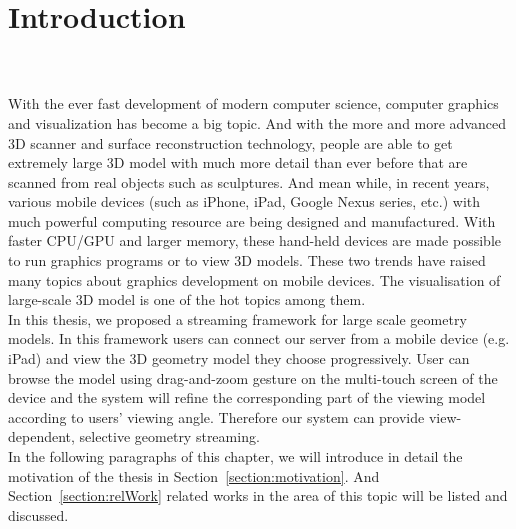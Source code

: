 \chapter{Introduction}
\label{chapter:introduction}
\\
\\

With the ever fast development of modern computer science, computer graphics and visualization has become a big topic. And with the more and more advanced 3D scanner and surface reconstruction technology, people are able to get extremely large 3D model with much more detail than ever before that are scanned from real objects such as sculptures. 
And mean while, in recent years, various mobile devices (such as iPhone, iPad, Google Nexus series, etc.) with much powerful computing resource are being designed and manufactured. With faster CPU/GPU and larger memory, these hand-held devices are made possible to run graphics programs or to view 3D models. These two trends have raised many topics about graphics development on mobile devices. The visualisation of large-scale 3D model is one of the hot topics among them. \\

In this thesis, we proposed a streaming framework for large scale geometry models. In this framework users can connect our server from a mobile device (e.g. iPad) and view the 3D geometry model they choose progressively. User can browse the model using drag-and-zoom gesture on the multi-touch screen of the device and the system will refine the corresponding part of the viewing model according to users' viewing angle. Therefore our system can provide view-dependent, selective geometry streaming. \\

In the following paragraphs of this chapter, we will introduce in detail the motivation of the thesis in Section~\ref{section:motivation}. And Section~\ref{section:relWork} related works in the area of this topic will be listed and discussed. \\

